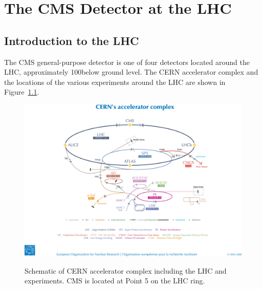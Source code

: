 \chapter{The CMS Detector at the LHC}
\label{c:CMS_Detector}

\section{Introduction to the LHC}
\label{s:Introduction}
The CMS general-purpose detector is one of four detectors located around the LHC, approximately 100\m below
ground level. The CERN accelerator complex and the locations of the various experiments around the LHC are
shown in Figure~\ref{fig:LHC_schematic}.

\begin{figure}[hbtp]
   \centering
     \includegraphics[width=\textwidth]{Chapters/04_Detector/Images/0812015.jpg}\\
     \caption[Schematic of LHC and experiments.]{Schematic of CERN accelerator complex including the LHC and
     experiments.
     CMS is located at Point 5 on the LHC ring.}
     \label{fig:LHC_schematic}
\end{figure}

